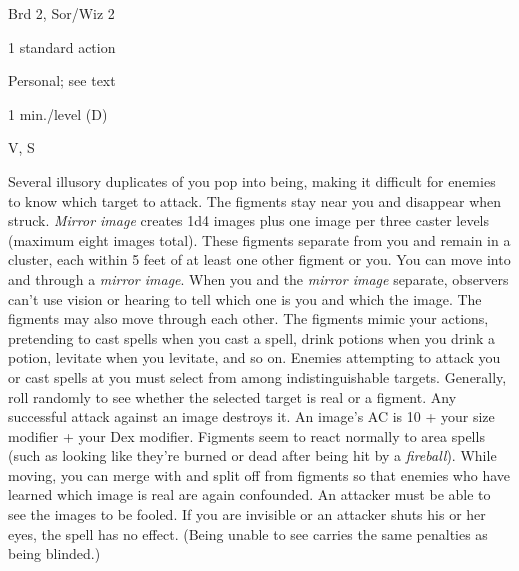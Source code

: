
\begin{description*}
\item[Level:] Brd 2, Sor/Wiz 2
\item[Casting Time:] 1 standard action
\item[Range:] Personal; see text
\item[Duration:] 1 min./level (D)
\item[Components:] V, S
\end{description*}

Several illusory duplicates of you pop into being, making it difficult for enemies
to know which target to attack. The figments stay near you and disappear when struck.
\textit{Mirror image} creates 1d4 images plus one image per three caster levels
(maximum eight images total). These figments separate from you and remain in a
cluster, each within 5 feet of at least one other figment or you. You can move
into and through a \textit{mirror image}. When you and the \textit{mirror image
}separate, observers can't use vision or hearing to tell which one is you and which
the image. The figments may also move through each other. The figments mimic your
actions, pretending to cast spells when you cast a spell, drink potions when you
drink a potion, levitate when you levitate, and so on.
Enemies attempting to attack you or cast spells at you must select from among indistinguishable
targets. Generally, roll randomly to see whether the selected target is real or
a figment. Any successful attack against an image destroys it. An image's AC is
10 + your size modifier + your Dex modifier. Figments seem to react normally to
area spells (such as looking like they're burned or dead after being hit by a \textit{fireball}).
While moving, you can merge with and split off from figments so that enemies who
have learned which image is real are again confounded.
An attacker must be able to see the images to be fooled. If you are invisible or
an attacker shuts his or her eyes, the spell has no effect. (Being unable to see
carries the same penalties as being blinded.)